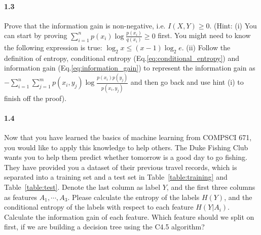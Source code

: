 \documentclass[11pt]{article}
\begin{document}
\paragraph{1.3} Prove that the information gain is non-negative, i.e. $I(X,Y)\geq 0$. 
(Hint: (i) You can start by proving  $\sum_{i=1}^n p(x_i) \log  \frac{p(x_i)}{q(x_i)} \geq 0$ first. You might need to know the following expression is true: $\log_2 x \leq  (x-1) \log_2 e $. (ii) Follow the definition of entropy, conditional entropy (Eq.\ref{eq:conditional_entropy}) and information gain (Eq.\ref{eq:information_gain}) to represent the information gain as $ - \sum_{i=1}^n \sum_{j=1}^m p(x_i, y_j )\log \frac{p(x_i) p(y_j)}{p(x_i, y_j )}$ and then go back and use hint (i) to finish off the proof).




\paragraph{1.4}
 Now that you have learned the basics of machine learning from COMPSCI 671, you would like to apply this knowledge to help others. The Duke Fishing Club wants you to help them predict whether tomorrow is a good day to go fishing. They have provided you a dataset of their previous travel records, which is separated into a training set and a test set in Table~\ref{table:training} and Table~\ref{table:test}. Denote the last column as label $Y$, and the first three columns as features $A_1, \cdots, A_3$. Please calculate the entropy of the labels $H(Y)$, and the conditional entropy of the labels with respect to each feature $H(Y|A_i)$. Calculate the information gain of each feature. Which feature should we split on first, if we are building a decision tree using the C4.5 algorithm? 
 
\end{document}
